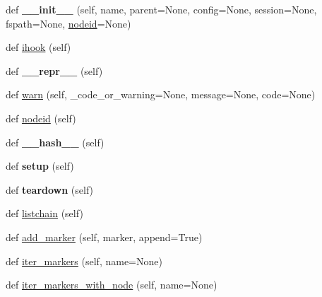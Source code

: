 \begin{DoxyCompactItemize}
\item 
\mbox{\label{class__pytest_1_1nodes_1_1_node_aafb9483e9eb0ad8f46d179c115a5d958}} 
def {\bfseries \+\_\+\+\_\+init\+\_\+\+\_\+} (self, name, parent=None, config=None, session=None, fspath=None, \hyperlink{class__pytest_1_1nodes_1_1_node_a02f18acbfaf1f9d8ba9b6c1346dc6217}{nodeid}=None)
\item 
def \hyperlink{class__pytest_1_1nodes_1_1_node_a33620824e3aa925412302590d53ea608}{ihook} (self)
\item 
\mbox{\label{class__pytest_1_1nodes_1_1_node_aa3bb8cb374a5ea883ce30b1c13c09e73}} 
def {\bfseries \+\_\+\+\_\+repr\+\_\+\+\_\+} (self)
\item 
def \hyperlink{class__pytest_1_1nodes_1_1_node_ab3e0c36e81b150fed632bbcec28cef45}{warn} (self, \+\_\+code\+\_\+or\+\_\+warning=None, message=None, code=None)
\item 
def \hyperlink{class__pytest_1_1nodes_1_1_node_a02f18acbfaf1f9d8ba9b6c1346dc6217}{nodeid} (self)
\item 
\mbox{\label{class__pytest_1_1nodes_1_1_node_a1c0eb35d68b3b192a5cd5fb9e72a9839}} 
def {\bfseries \+\_\+\+\_\+hash\+\_\+\+\_\+} (self)
\item 
\mbox{\label{class__pytest_1_1nodes_1_1_node_a577d9d44cca3919f05f38914bc88072a}} 
def {\bfseries setup} (self)
\item 
\mbox{\label{class__pytest_1_1nodes_1_1_node_ac035104c125eec514a24252a5aa6cabc}} 
def {\bfseries teardown} (self)
\item 
def \hyperlink{class__pytest_1_1nodes_1_1_node_ae0847320698244a5c0a872d4aa19a618}{listchain} (self)
\item 
def \hyperlink{class__pytest_1_1nodes_1_1_node_a1d28d2a0ab91d7845025435ff7d3ff7c}{add\+\_\+marker} (self, marker, append=True)
\item 
def \hyperlink{class__pytest_1_1nodes_1_1_node_a6907ee44236e82a68ac370c11a48171a}{iter\+\_\+markers} (self, name=None)
\item 
def \hyperlink{class__pytest_1_1nodes_1_1_node_a141c959ae7dbfde9b8de55e11f841ed7}{iter\+\_\+markers\+\_\+with\+\_\+node} (self, name=None)

\end{DoxyCompactItemize}
